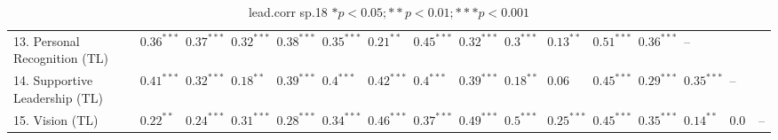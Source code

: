 \begin{table}[ht]
\begin{tabular}{llllllllllllllll}
  13. Personal Recognition (TL) & $0.36^{***}$ & $0.37^{***}$ & $0.32^{***}$ & $0.38^{***}$ & $0.35^{***}$ & $0.21^{**}$ & $0.45^{***}$ & $0.32^{***}$ & $0.3^{***}$ & $0.13^{**}$ & $0.51^{***}$ & $0.36^{***}$ & -- &  &  \\ 
  14. Supportive Leadership (TL) & $0.41^{***}$ & $0.32^{***}$ & $0.18^{**}$ & $0.39^{***}$ & $0.4^{***}$ & $0.42^{***}$ & $0.4^{***}$ & $0.39^{***}$ & $0.18^{**}$ & $0.06$ & $0.45^{***}$ & $0.29^{***}$ & $0.35^{***}$ & -- &  \\ 
  15. Vision (TL) & $0.22^{**}$ & $0.24^{***}$ & $0.31^{***}$ & $0.28^{***}$ & $0.34^{***}$ & $0.46^{***}$ & $0.37^{***}$ & $0.49^{***}$ & $0.5^{***}$ & $0.25^{***}$ & $0.45^{***}$ & $0.35^{***}$ & $0.14^{**}$ & $0.06$ & -- \\ 
   \hline
\end{tabular}
\caption{lead.corr sp.18 $* p < 0.05; ** p < 0.01; *** p < 0.001$} 
\label{freq_corr.lead.corr.sp.18}
\end{table}
